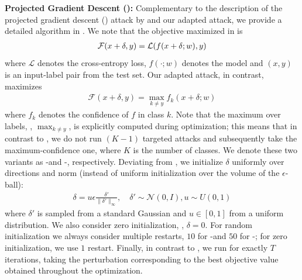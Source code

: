 \textbf{Projected Gradient Descent (\PGD):}
%
Complementary to the description of the projected gradient descent (\PGD) attack by \cite{MadryICLR2018} and our adapted attack, we provide a detailed algorithm in . We note that the objective maximized in \citep{MadryICLR2018} is
\begin{align}
    \mathcal{F}(x + \delta, y) = \mathcal{L}(f(x + \delta; w), y)\label{eq:supp-attack}
\end{align}
where $\mathcal{L}$ denotes the cross-entropy loss, $f(\cdot;w)$ denotes the model and $(x,y)$ is an input-label pair from the test set. Our adapted attack, in contrast, maximizes
\begin{align}
    \mathcal{F}(x + \delta, y) = \max_{k\neq y}f_k(x + \delta;w)\label{eq:supp-conf-attack}
\end{align}
where $f_k$ denotes the confidence of $f$ in class $k$. Note that the maximum over labels, \ie, $\max_{k\neq y}$, is explicitly computed during optimization; this means that in contrast to \citep{GoodfellowOPENREVIEW2019}, we do not run $(K - 1)$ targeted attacks and subsequently take the maximum-confidence one, where $K$ is the number of classes. We denote these two variants as \PGD-\FCE and \PGD-\FConf, respectively. Deviating from \citep{MadryICLR2018}, we initialize $\delta$ uniformly over directions and norm (instead of uniform initialization over the volume of the $\epsilon$-ball):
\begin{align}
    \delta = u\epsilon \frac{\delta'}{\|\delta'\|_\infty},\quad\delta' \sim \mathcal{N}(0, I),u\sim U(0,1)\label{eq:supp-initialization}
\end{align}
where $\delta'$ is sampled from a standard Gaussian and $u \in [0,1]$ from a uniform distribution. We also consider zero initialization, \ie, $\delta = 0$. For random initialization we always consider multiple restarts, $10$ for \PGD-\FConf and $50$ for \PGD-\FCE; for zero initialization, we use $1$ restart. Finally, in contrast to \cite{MadryICLR2018}, we run \PGD for exactly $T$ iterations, taking the perturbation corresponding to the best objective value obtained throughout the optimization.

